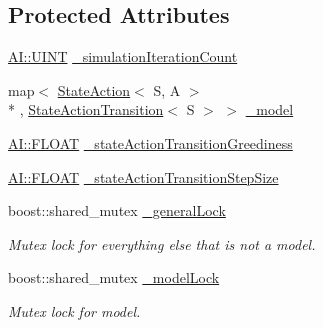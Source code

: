 \subsection*{Protected Attributes}
\begin{DoxyCompactItemize}
\item 
\hyperlink{namespaceAI_ab6e14dc1e659854858a87e511f1439ec}{A\+I\+::\+U\+I\+N\+T} \hyperlink{classAI_1_1Algorithm_1_1DynaQBase_a3d375c3e01c7cc8a30c92109780adb9b}{\+\_\+simulation\+Iteration\+Count}
\item 
map$<$ \hyperlink{classAI_1_1StateAction}{State\+Action}$<$ S, A $>$\\*
, \hyperlink{classAI_1_1Algorithm_1_1StateActionTransition}{State\+Action\+Transition}$<$ S $>$ $>$ \hyperlink{classAI_1_1Algorithm_1_1DynaQBase_a65878fdff793c8b4bef59bb128e19bd8}{\+\_\+model}
\item 
\hyperlink{namespaceAI_a41b74884a20833db653dded3918e05c3}{A\+I\+::\+F\+L\+O\+A\+T} \hyperlink{classAI_1_1Algorithm_1_1DynaQBase_ae3f83dbeea191fc8bdcd518a2e54af97}{\+\_\+state\+Action\+Transition\+Greediness}
\item 
\hyperlink{namespaceAI_a41b74884a20833db653dded3918e05c3}{A\+I\+::\+F\+L\+O\+A\+T} \hyperlink{classAI_1_1Algorithm_1_1DynaQBase_a1fd132ae0aeb356a891e5b81bf218338}{\+\_\+state\+Action\+Transition\+Step\+Size}
\item 
\hypertarget{classAI_1_1Algorithm_1_1DynaQBase_adc3615604882454399863291f73b8734}{boost\+::shared\+\_\+mutex \hyperlink{classAI_1_1Algorithm_1_1DynaQBase_adc3615604882454399863291f73b8734}{\+\_\+general\+Lock}}\label{classAI_1_1Algorithm_1_1DynaQBase_adc3615604882454399863291f73b8734}

\begin{DoxyCompactList}\small\item\em Mutex lock for everything else that is not a model. \end{DoxyCompactList}\item 
\hypertarget{classAI_1_1Algorithm_1_1DynaQBase_ab166bd02d02f17c76a7626372c649849}{boost\+::shared\+\_\+mutex \hyperlink{classAI_1_1Algorithm_1_1DynaQBase_ab166bd02d02f17c76a7626372c649849}{\+\_\+model\+Lock}}\label{classAI_1_1Algorithm_1_1DynaQBase_ab166bd02d02f17c76a7626372c649849}

\begin{DoxyCompactList}\small\item\em Mutex lock for model. \end{DoxyCompactList}\end{DoxyCompactItemize}



